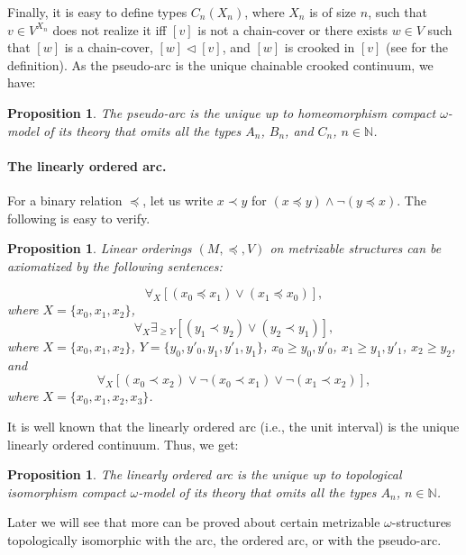 \documentclass[12pt]{amsart}
\theoremstyle{plain}
\newtheorem{proposition}[theorem]{\bf Proposition}
\newcommand \NN{\mathbb{N}}
\begin{document}
Finally, it is easy to define types $C_n(X_n)$, where $X_n$ is of size $n$,  such that $v \in V^{X_n}$ does not realize it iff $[v]$ is not a chain-cover or there exists $w \in V$ such that $[w]$ is a chain-cover, $[w] \lhd [v]$, and $[w]$ is crooked in $[v]$ (see \cite{BaBiVi2} for the definition). As the pseudo-arc is the unique chainable crooked continuum, we have:
%

\begin{proposition}
	\label{pr:Pseudoarc}
	The pseudo-arc is the unique up to homeomorphism  compact $\omega$-model of its theory that omits all the types $A_n$, $B_n$, and $C_n$, $n \in \NN$.
\end{proposition}

\paragraph{\textbf{The linearly ordered arc}.} For a binary relation $\preceq$, let us write $x\prec y$ for $(x \preceq y) \wedge \neg (y \preceq x)$. The following is easy to verify.


\begin{proposition}
	Linear orderings $(M,\preceq,V)$ on metrizable structures can be axiomatized by the following sentences: 
	
	\[ \forall_X [(x_0 \preceq x_1)\vee (x_1 \preceq x_0)],   \]
	where $X=\{x_0, x_1, x_2\}$,
	\[ \forall_X \exists_{\geq Y} [(y_1 \prec y_2)\vee (y_2 \prec y_1)],   \]
	where $X=\{x_0, x_1, x_2\}$, $Y=\{ y_0,y'_0, y_1,y'_1, y_1 \}$, $x_0 \geq y_0, y'_0$, $x_1 \geq y_1, y'_1$, $x_2 \geq y_2$, and
	\[ \forall_X [(x_0 \prec x_2)\vee \neg (x_0 \prec x_1) \vee \neg (x_1 \prec x_2) ],   \]
	where $X=\{x_0, x_1, x_2,x_3\}$.
	
\end{proposition}

It is well known that the linearly ordered arc (i.e., the unit interval) is the unique linearly ordered continuum. Thus, we get:

\begin{proposition}
	\label{pr:OrderedArc}
	The linearly ordered arc is the unique up to topological isomorphism compact $\omega$-model of its theory that omits all the types $A_n$, $n \in \NN$.
\end{proposition}

Later we will see that more can be proved about certain metrizable $\omega$-structures topologically isomorphic with the arc, the ordered arc, or with the pseudo-arc.
	
\end{document}
